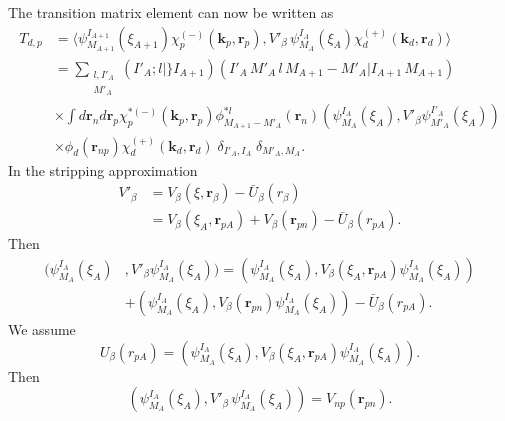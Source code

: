 The transition matrix element can now be written as
\begin{equation}\label{eq423}
 \begin{split}
T_{d,p}&= \langle \psi_{M_{A+1}}^{I_{A+1}}(\xi_{A+1}) \chi^{(-)}_p(\mathbf k_p,\mathbf r_p),
V'_\beta \, \psi_{M_{A}}^{I_{A}}(\xi_{A}) \chi^{(+)}_d(\mathbf k_d,\mathbf r_d)\rangle \\
&= \sum_{\substack{l,I'_A\\M'_A}} (I'_A;l \vert \} I_{A+1}) (I'_A \,M'_A\, l\, M_{A+1}-M'_A \vert I_{A+1}\,M_{A+1})\\
& \times\int d\mathbf r_n d \mathbf r_p \chi^{* (-)}_p(\mathbf k_p,\mathbf r_p) \phi_{M_{A+1}-M'_A}^{*l}(\mathbf r_n)
(\psi_{M_{A}}^{I_{A}}(\xi_{A}),V'_\beta \psi_{M'_{A}}^{I'_{A}}(\xi_{A}))\\
& \times\phi_d(\mathbf r_{np})
\chi^{(+)}_d(\mathbf k_d,\mathbf r_d) \; \delta_{I'_A,I_A} \; \delta_{M'_A,M_A}.
\end{split}
\end{equation}
In the stripping approximation
\begin{equation}\label{eq424}
 \begin{split}
V'_\beta & = V_\beta(\xi,\mathbf r_\beta)- \bar U_\beta (r_\beta)\\
&=V_\beta(\xi_A,\mathbf r_{pA})+V_\beta(\mathbf r_{pn})-\bar U_\beta (r_{pA}).
\end{split}
\end{equation}
Then
\begin{equation}\label{eq425}
 \begin{split}
(\psi_{M_{A}}^{I_{A}}(\xi_{A}) & ,V'_\beta \psi_{M_{A}}^{I_{A}}(\xi_{A}))=
(\psi_{M_{A}}^{I_{A}}(\xi_{A}), V_\beta(\xi_A,\mathbf r_{pA}) \psi_{M_{A}}^{I_{A}}(\xi_{A}))\\
&+(\psi_{M_{A}}^{I_{A}}(\xi_{A}), V_\beta(\mathbf r_{pn})
\psi_{M_{A}}^{I_{A}}(\xi_{A}))- \bar U_\beta (r_{pA}).
\end{split}
\end{equation}
We assume
\begin{equation}\label{eq426}
  U_\beta (r_{pA})=(\psi_{M_{A}}^{I_{A}}(\xi_{A}), V_\beta(\xi_A,\mathbf r_{pA}) \psi_{M_{A}}^{I_{A}}(\xi_{A})).
\end{equation}
Then
\begin{equation}\label{eq427}
(\psi_{M_{A}}^{I_{A}}(\xi_{A}), V'_\beta\, \psi_{M_{A}}^{I_{A}}(\xi_{A}))= V_{np}(\mathbf r_{pn}).
\end{equation}

